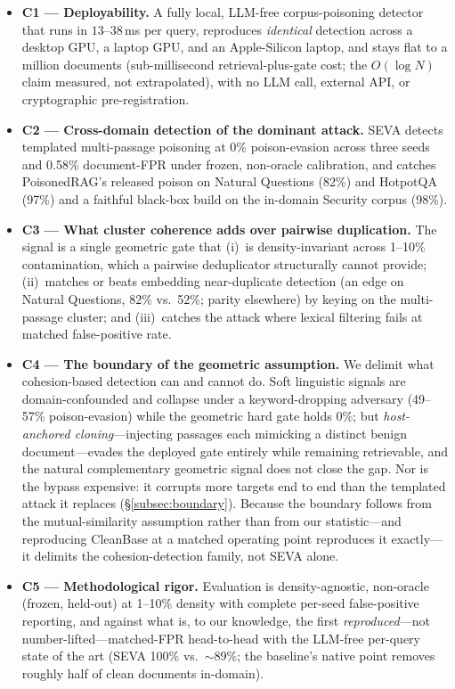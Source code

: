 \documentclass[10pt,journal,compsoc]{IEEEtran}
\begin{document}
\begin{itemize}
\item \textbf{C1 --- Deployability.} A fully local, LLM-free corpus-poisoning detector
that runs in $13$--$38$\,ms per query, reproduces \emph{identical} detection across a desktop
GPU, a laptop GPU, and an Apple-Silicon laptop, and stays flat to a million documents
(sub-millisecond retrieval-plus-gate cost; the $O(\log N)$ claim measured, not extrapolated),
with no LLM call, external API, or cryptographic pre-registration.

\item \textbf{C2 --- Cross-domain detection of the dominant attack.} SEVA detects templated
multi-passage poisoning at 0\% poison-evasion across three seeds and 0.58\% document-FPR under
frozen, non-oracle calibration, and catches PoisonedRAG's released poison on Natural Questions
(82\%) and HotpotQA (97\%) and a faithful black-box build on the in-domain Security corpus
(98\%).

\item \textbf{C3 --- What cluster coherence adds over pairwise duplication.} The signal is a
single geometric gate that (i)~is density-invariant across 1--10\% contamination, which a
pairwise deduplicator structurally cannot provide; (ii)~matches or beats embedding
near-duplicate detection (an edge on Natural Questions, 82\% vs.\ 52\%; parity elsewhere) by
keying on the multi-passage cluster; and (iii)~catches the attack where lexical filtering fails
at matched false-positive rate.

\item \textbf{C4 --- The boundary of the geometric assumption.} We delimit what cohesion-based
detection can and cannot do. Soft linguistic signals are domain-confounded and collapse under a
keyword-dropping adversary (49--57\% poison-evasion) while the geometric hard gate holds $0\%$;
but \emph{host-anchored cloning}---injecting passages each mimicking a distinct benign
document---evades the deployed gate entirely while remaining retrievable, and the natural
complementary geometric signal does not close the gap. Nor is the bypass expensive: it corrupts
more targets end to end than the templated attack it replaces (\S\ref{subsec:boundary}). Because
the boundary follows from the mutual-similarity assumption rather than from our statistic---and
reproducing CleanBase at a matched operating point reproduces it exactly---it delimits the
cohesion-detection family, not SEVA alone.

\item \textbf{C5 --- Methodological rigor.} Evaluation is density-agnostic, non-oracle (frozen,
held-out) at 1--10\% density with complete per-seed false-positive reporting, and against what
is, to our knowledge, the first \emph{reproduced}---not number-lifted---matched-FPR head-to-head
with the LLM-free per-query state of the art (SEVA 100\% vs.\ $\sim$89\%; the baseline's native
point removes roughly half of clean documents in-domain).


\end{itemize}
\end{document}
